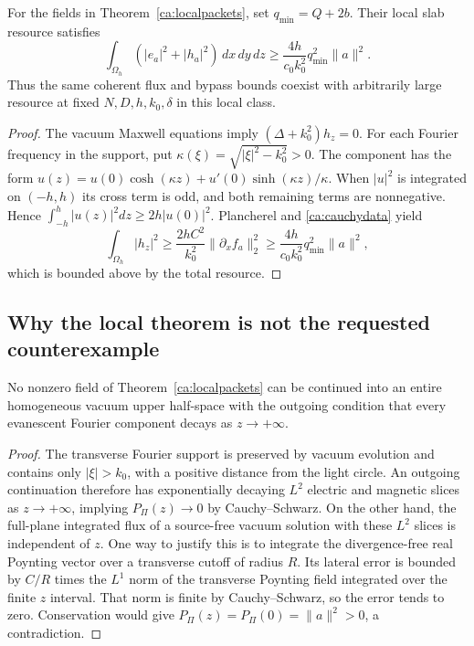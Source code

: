 \begin{proposition}
\label{ca:packetresource}
For the fields in Theorem~\ref{ca:localpackets}, set $q_{\min}=Q+2b$.
Their local slab resource satisfies
\begin{equation}
 \int_{\Omega_h}(|e_a|^2+|h_a|^2)\,dx\,dy\,dz
 \geq\frac{4h}{c_0k_0^2}q_{\min}^2\|a\|^2.
 \label{ca:packetresourceeq}
\end{equation}
Thus the same coherent flux and bypass bounds coexist with arbitrarily
large resource at fixed $N,D,h,k_0,\delta$ in this local class.
\end{proposition}
\begin{proof}
The vacuum Maxwell equations imply $(\Delta+k_0^2)h_z=0$.
For each Fourier frequency in the support, put
$\kappa(\xi)=\sqrt{|\xi|^2-k_0^2}>0$.
The component has the form
$u(z)=u(0)\cosh(\kappa z)+u'(0)\sinh(\kappa z)/\kappa$.
When $|u|^2$ is integrated on $(-h,h)$ its cross term is odd, and both
remaining terms are nonnegative.  Hence
$\int_{-h}^h|u(z)|^2dz\geq2h|u(0)|^2$.
Plancherel and \eqref{ca:cauchydata} yield
\begin{equation}
 \int_{\Omega_h}|h_z|^2\geq
 \frac{2hC^2}{k_0^2}\|\partial_xf_a\|_2^2
 \geq\frac{4h}{c_0k_0^2}q_{\min}^2\|a\|^2,
 \label{ca:packetresproof}
\end{equation}
which is bounded above by the total resource.
\end{proof}

\subsection{Why the local theorem is not the requested counterexample}

\begin{proposition}
\label{ca:outgoingfailure}
No nonzero field of Theorem~\ref{ca:localpackets} can be continued into an
entire homogeneous vacuum upper half-space with the outgoing condition
that every evanescent Fourier component decays as $z\to+\infty$.
\end{proposition}
\begin{proof}
The transverse Fourier support is preserved by vacuum evolution and
contains only $|\xi|>k_0$, with a positive distance from the light circle.
An outgoing continuation therefore has exponentially decaying $L^2$
electric and magnetic slices as $z\to+\infty$, implying
$P_\Pi(z)\to0$ by Cauchy--Schwarz.
On the other hand, the full-plane integrated flux of a source-free vacuum
solution with these $L^2$ slices is independent of $z$.  One way to justify
this is to integrate the divergence-free real Poynting vector over a
transverse cutoff of radius $R$.  Its lateral error is bounded by
$C/R$ times the $L^1$ norm of the transverse Poynting field integrated
over the finite $z$ interval.  That norm is finite by Cauchy--Schwarz,
so the error tends to zero.  Conservation would give
$P_\Pi(z)=P_\Pi(0)=\|a\|^2>0$, a contradiction.
\end{proof}

